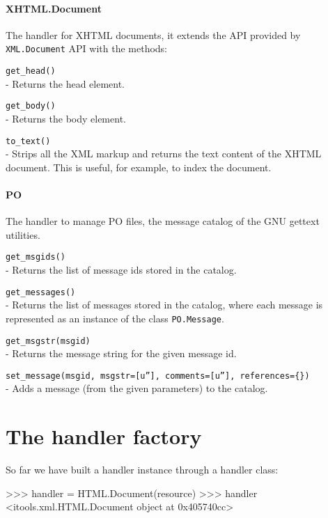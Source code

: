 \paragraph{XHTML.Document}

The handler for XHTML documents, it extends the API provided by
{\tt XML.Document} API with the methods:

\begin{api}
  {\tt get\_head()}\\
  - Returns the head element.

  {\tt get\_body()}\\
  - Returns the body element.

  {\tt to\_text()}\\
  - Strips all the XML markup and returns the text content of the XHTML
    document. This is useful, for example, to index the document.
\end{api}

\paragraph{PO}

The handler to manage PO files, the message catalog of the GNU gettext
utilities.

\begin{api}
  {\tt get\_msgids()}\\
  - Returns the list of message ids stored in the catalog.

  {\tt get\_messages()}\\
  - Returns the list of messages stored in the catalog, where each message
    is represented as an instance of the class {\tt PO.Message}.

  {\tt get\_msgstr(msgid)}\\
  - Returns the message string for the given message id.

  {\tt set\_message(msgid, msgstr=[u''], comments=[u''], references=\{\})}\\
  - Adds a message (from the given parameters) to the catalog.
\end{api}


\section{The handler factory}

So far we have built a handler instance through a handler class:

\begin{code}
    >>> handler = HTML.Document(resource)
    >>> handler
    <itools.xml.HTML.Document object at 0x405740cc>
\end{code}

